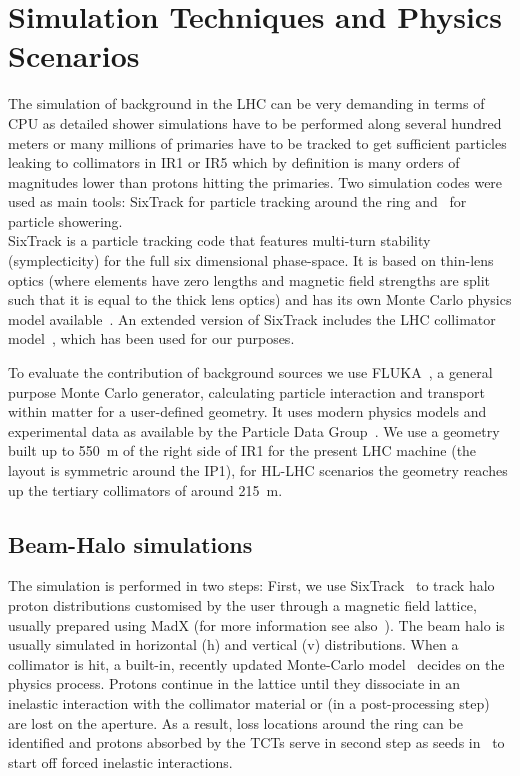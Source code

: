 \section{Simulation Techniques and Physics Scenarios\label{simSetup}}

The simulation of background in the LHC can be very demanding in terms of CPU as detailed shower simulations have to be performed along several hundred meters or many millions of primaries have to be tracked to get sufficient particles leaking to collimators in IR1 or IR5 which by definition is many orders of magnitudes lower than protons hitting the primaries. Two simulation codes were used as main tools: SixTrack for particle tracking around the ring and \fluka~for particle showering.\\

 SixTrack is a particle tracking code that features multi-turn stability (symplecticity) for the full six dimensional phase-space. It is based on thin-lens optics (where elements have zero lengths and magnetic field strengths are split such that it is equal to the thick lens optics) and has its own Monte Carlo physics model available~\cite{K2Ref}. An extended version of SixTrack includes the LHC collimator model~\cite{SixTrackRef}, which has been used for our purposes.

To evaluate the contribution of background sources we use FLUKA~\cite{flukaRef1,flukaRef2}, a general purpose Monte Carlo generator, calculating particle interaction and transport within matter for a user-defined geometry. It uses modern physics models and experimental data as available by the Particle Data Group~\cite{pdgRef}.
We use a geometry built up to 550~m of the right side of IR1 for the present LHC machine (the layout is symmetric around the IP1), for HL-LHC scenarios the geometry reaches up the tertiary collimators of around 215~m. 


\subsection{Beam-Halo simulations}
The simulation is performed in two steps: First, we use SixTrack~\cite{SixTrackRef} to track halo proton distributions customised by the user through a magnetic field lattice, usually prepared using MadX (for more information see also~\cite{chiarasThesis}). The beam halo is usually simulated in horizontal (h) and vertical (v) distributions. When a collimator is hit, a built-in, recently updated Monte-Carlo model~\cite{claudiasThesis} decides on the physics process. Protons continue in the lattice until they dissociate in an inelastic interaction with the collimator material or (in a post-processing step) are lost on the aperture. As a result, loss locations around the ring can be identified and protons absorbed by the TCTs serve in second step as seeds in \fluka~to start off forced inelastic interactions.

